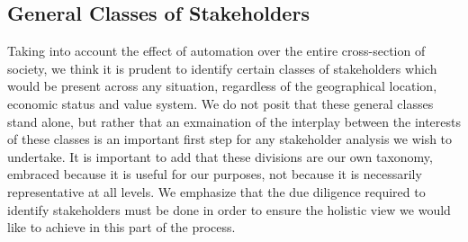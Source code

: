 \subsection{General Classes of Stakeholders}
\label{sec:-general}
Taking into account the effect of automation over the entire cross-section of society, we think it is prudent to identify certain classes of stakeholders which would be present across any situation, regardless of the geographical location, economic status and value system.  We do not posit that these general classes stand alone, but rather that an exmaination of the interplay between the interests of these classes is an important first step for any stakeholder analysis we wish to undertake.  
It is important to add that these divisions are our own taxonomy, embraced because it is useful for our purposes, not because it is necessarily representative at all levels. We emphasize that the due diligence required to identify stakeholders must be done in order to ensure the holistic view we would like to achieve in this part of the process.
